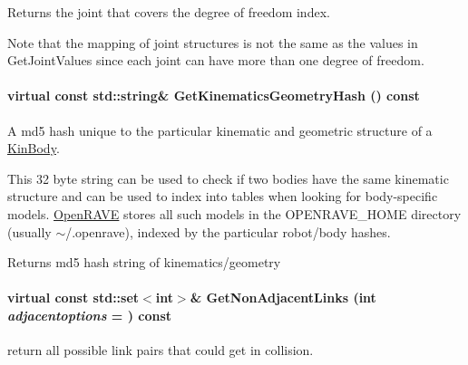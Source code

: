 Returns the joint that covers the degree of freedom index. 

Note that the mapping of joint structures is not the same as the values in GetJointValues since each joint can have more than one degree of freedom. \hypertarget{classOpenRAVE_1_1KinBody_a911ecdc66e68c59e2be7eeec162b238a}{
\paragraph[{GetKinematicsGeometryHash}]{\setlength{\rightskip}{0pt plus 5cm}virtual const std::string\& GetKinematicsGeometryHash () const}\hfill}
\label{classOpenRAVE_1_1KinBody_a911ecdc66e68c59e2be7eeec162b238a}


A md5 hash unique to the particular kinematic and geometric structure of a \hyperlink{classOpenRAVE_1_1KinBody}{KinBody}. 

This 32 byte string can be used to check if two bodies have the same kinematic structure and can be used to index into tables when looking for body-\/specific models. \hyperlink{namespaceOpenRAVE}{OpenRAVE} stores all such models in the OPENRAVE\_\-HOME directory (usually $\sim$/.openrave), indexed by the particular robot/body hashes. \begin{DoxyReturn}{Returns}
md5 hash string of kinematics/geometry 
\end{DoxyReturn}
\hypertarget{classOpenRAVE_1_1KinBody_a0dfdf7668c68c2860a27983804e90c8b}{
\paragraph[{GetNonAdjacentLinks}]{\setlength{\rightskip}{0pt plus 5cm}virtual const std::set$<$int$>$\& GetNonAdjacentLinks (int {\em adjacentoptions} = {}) const}\hfill}
\label{classOpenRAVE_1_1KinBody_a0dfdf7668c68c2860a27983804e90c8b}


return all possible link pairs that could get in collision. 


